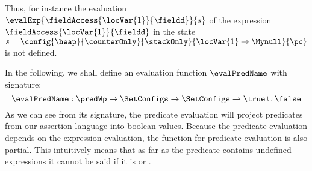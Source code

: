 Thus, for instance the evaluation  $\evalExp{ \fieldAccess{\locVar{1}}{\fieldd}  }{s}$ of the expression $ \fieldAccess{\locVar{1}}{\fieldd} $  in the
 state $s =\config{\heap}{\counterOnly}{ \stackOnly }{\locVar{1} \rightarrow \Mynull  }{\pc } $ is not defined.



In the following, we shall define an evaluation function $\evalPredName$ with signature: 
$$\evalPredName :\predWp \rightarrow \SetConfigs  \rightarrow \SetConfigs  \rightharpoonup  \true \cup \false $$
As we can see from its signature, the predicate evaluation will project predicates from  our assertion language 
into boolean values. Because the predicate evaluation depends on the expression evaluation, the function for predicate 
evaluation is also partial. This intuitively means that as far as the predicate contains undefined expressions
it cannot be said if it is \true{} or \false. 

